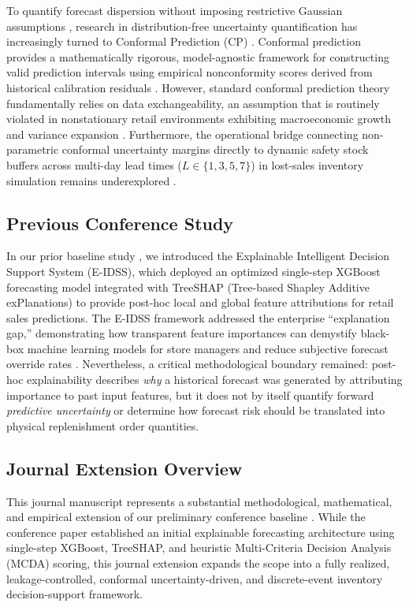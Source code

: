 \documentclass[11pt,a4paper]{article}
\begin{document}
To quantify forecast dispersion without imposing restrictive Gaussian assumptions \cite{silver1998inventory}, research in distribution-free uncertainty quantification has increasingly turned to Conformal Prediction (CP) \cite{vovk2005algorithmic, angelopoulos2021gentle}. Conformal prediction provides a mathematically rigorous, model-agnostic framework for constructing valid prediction intervals using empirical nonconformity scores derived from historical calibration residuals \cite{stankeviciute2021conformal, huber2019integrating}. However, standard conformal prediction theory fundamentally relies on data exchangeability, an assumption that is routinely violated in nonstationary retail environments exhibiting macroeconomic growth and variance expansion \cite{barber2023conformal, tibshirani2019conformal}. Furthermore, the operational bridge connecting non-parametric conformal uncertainty margins directly to dynamic safety stock buffers across multi-day lead times ($L \in \{1, 3, 5, 7\}$) in lost-sales inventory simulation remains underexplored \cite{syntetos2016supply, axsaeter2015inventory, snyder2019fundamentals}.

\subsection{Previous Conference Study}
\label{sec:intro_conference}
In our prior baseline study \cite{e_idss_ieee}, we introduced the Explainable Intelligent Decision Support System (E-IDSS), which deployed an optimized single-step XGBoost forecasting model integrated with TreeSHAP (Tree-based Shapley Additive exPlanations) \cite{lundberg2017unified} to provide post-hoc local and global feature attributions for retail sales predictions. The E-IDSS framework addressed the enterprise ``explanation gap,'' demonstrating how transparent feature importances can demystify black-box machine learning models for store managers and reduce subjective forecast override rates \cite{lin2026critical, chaganti2026, narlawar2025explainable, chang2025explainable, madabhushini2025}. Nevertheless, a critical methodological boundary remained: post-hoc explainability describes \emph{why} a historical forecast was generated by attributing importance to past input features, but it does not by itself quantify forward \emph{predictive uncertainty} or determine how forecast risk should be translated into physical replenishment order quantities.

\subsection{Journal Extension Overview}
\label{sec:intro_extension}
This journal manuscript represents a substantial methodological, mathematical, and empirical extension of our preliminary conference baseline \cite{e_idss_ieee}. While the conference paper established an initial explainable forecasting architecture using single-step XGBoost, TreeSHAP, and heuristic Multi-Criteria Decision Analysis (MCDA) scoring, this journal extension expands the scope into a fully realized, leakage-controlled, conformal uncertainty-driven, and discrete-event inventory decision-support framework.
\end{document}
